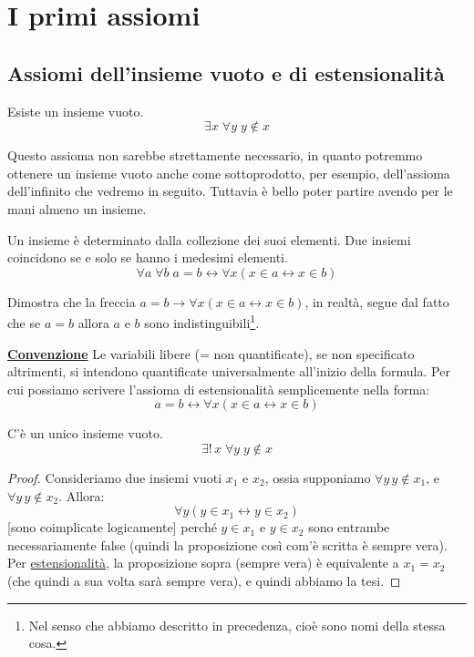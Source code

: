 \documentclass[11pt]{scrartcl}
\begin{document}
\newpage
\section{I primi assiomi}
\subsection{Assiomi dell'insieme vuoto e di estensionalità}
\begin{axiom}
\label{ax1}
Esiste un insieme vuoto.
\[ \exists x \; \forall y \; y \not\in x
		\]
\end{axiom}

\begin{note}
Questo assioma non sarebbe strettamente necessario, in quanto potremmo ottenere un insieme vuoto anche come sottoprodotto, per esempio, dell'assioma dell'infinito che vedremo in seguito.
Tuttavia è bello poter partire avendo per le mani almeno un insieme.
\end{note}

\begin{axiom}
\label{ax2}
Un insieme è determinato dalla collezione dei suoi elementi. Due insiemi coincidono se e solo se hanno i medesimi elementi.
\[ \forall a \; \forall b \; a = b \leftrightarrow \forall x (x \in a \leftrightarrow x \in b)
	\]
\end{axiom}

\begin{exercise}
Dimostra che la freccia $a = b \rightarrow \forall x (x \in a \leftrightarrow x \in b)$, in realtà, segue dal fatto che se $a = b$ allora $a$ e $b$ sono indistinguibili\footnote{Nel senso che abbiamo descritto in precedenza, cioè sono nomi della stessa cosa.}.
\end{exercise}

\textbf{\underline{Convenzione}} Le variabili libere (= non quantificate), se non specificato altrimenti, si intendono quantificate universalmente all'inizio della formula. Per cui possiamo scrivere
l'assioma di estensionalità semplicemente nella forma:
\[ a = b \leftrightarrow \forall x (x \in a \leftrightarrow x \in b)
	\]

\begin{proposition}
C'è un unico insieme vuoto.
\[ \exists ! \, x \; \forall y \; y \not \in x
	\]
\end{proposition}

\begin{proof}
Consideriamo due insiemi vuoti $x_1$ e $x_2$, ossia supponiamo $\forall y \, y \not\in x_1$, e $\forall y \, y \not \in x_2$. Allora:
\[ \forall y (y \in x_1 \leftrightarrow y \in x_2)
	\]
[sono coimplicate logicamente] perché $y \in x_1$ e $y \in x_2$ sono entrambe necessariamente false (quindi la proposizione così com'è scritta è sempre vera). Per \hyperref[ax2]{estensionalità}, la proposizione sopra (sempre vera) è equivalente a $x_1 = x_2$ (che quindi a sua volta sarà sempre vera), e quindi abbiamo la tesi.
\end{proof}
\end{document}
